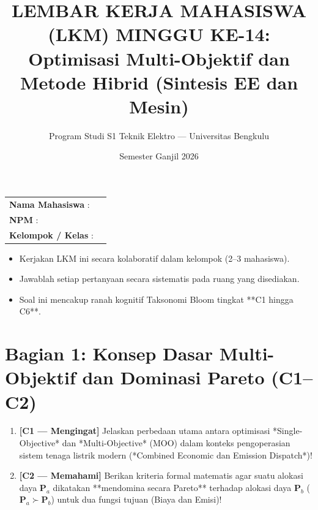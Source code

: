 \documentclass[11pt,a4paper]{article}
\title{\vspace{-1cm}\textbf{LEMBAR KERJA MAHASISWA (LKM) MINGGU KE-14:}\\Optimisasi Multi-Objektif dan Metode Hibrid (Sintesis EE dan Mesin)}
\author{Program Studi S1 Teknik Elektro --- Universitas Bengkulu}
\date{Semester Ganjil 2026}
\begin{document}
\maketitle

\begin{tcolorbox}[colback=unibblue!5,colframe=unibblue,title=\textbf{Identitas Mahasiswa dan Instruksi}]
\begin{tabular}{ll}
\textbf{Nama Mahasiswa} : & \hrulefill\hspace{6cm} \\
\textbf{NPM} : & \hrulefill\hspace{6cm} \\
\textbf{Kelompok / Kelas} : & \hrulefill\hspace{6cm} \\
\end{tabular}
\vspace{0.2cm}
\begin{itemize}[leftmargin=*]
    \item Kerjakan LKM ini secara kolaboratif dalam kelompok (2--3 mahasiswa).
    \item Jawablah setiap pertanyaan secara sistematis pada ruang yang disediakan.
    \item Soal ini mencakup ranah kognitif Taksonomi Bloom tingkat **C1 hingga C6**.
\end{itemize}
\end{tcolorbox}

\vspace{0.3cm}

\section*{Bagian 1: Konsep Dasar Multi-Objektif dan Dominasi Pareto (C1--C2)}

\begin{enumerate}[label=\textbf{Soal \arabic*:}, leftmargin=*]
    \item \textbf{[C1 --- Mengingat]} Jelaskan perbedaan utama antara optimisasi *Single-Objective* dan *Multi-Objective* (MOO) dalam konteks pengoperasian sistem tenaga listrik modern (*Combined Economic dan Emission Dispatch*)!
    
    \begin{tcolorbox}[colback=white,colframe=gray!50,height=3cm,title=Ruang Jawaban Soal 1]
    \end{tcolorbox}

    \item \textbf{[C2 --- Memahami]} Berikan kriteria formal matematis agar suatu alokasi daya $\mathbf{P}_a$ dikatakan **mendomina secara Pareto** terhadap alokasi daya $\mathbf{P}_b$ ($\mathbf{P}_a \succ \mathbf{P}_b$) untuk dua fungsi tujuan (Biaya dan Emisi)!
    
    \begin{tcolorbox}[colback=white,colframe=gray!50,height=3.5cm,title=Ruang Jawaban Soal 2]
    \end{tcolorbox}
\end{enumerate}
\end{document}
